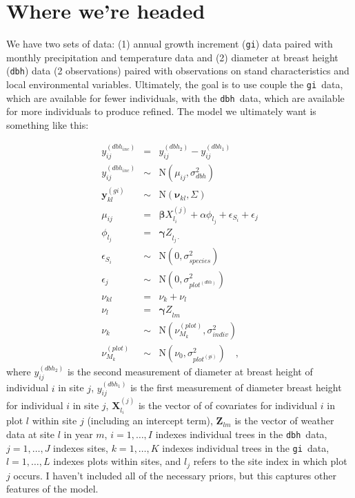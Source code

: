 \documentclass[12pt]{article}
\newcommand{\gi}{{\tt gi}}
\newcommand{\dbh}{{\tt dbh}}
\begin{document}
\section*{Where we're headed}

We have two sets of data: (1) annual growth increment (\gi) data paired
with monthly precipitation and temperature data and (2) diameter at
breast height (\dbh) data (2 observations) paired with observations on stand
characteristics and local environmental variables. Ultimately, the
goal is to use couple the \gi\ data, which are available for fewer
individuals, with the \dbh\ data, which are available for more
individuals to produce refined. The model we ultimately want is
something like this:

\begin{eqnarray*}
y^{(dbh_{inc})}_{ij} &=& y^{(dbh_2)}_{ij} - y^{(dbh_1)}_{ij} \\
y^{(dbh_{inc})}_{ij} &\sim& \mbox{N}(\mu_{ij}, \sigma^2_{dbh}) \\
{\bm y}^{(gi)}_{kl} &\sim& \mbox{N}({\bm\nu}_{kl}, \Sigma) \\
\mu_{ij} &=& {\bm\beta X}_{l_i}^{(j)} + \alpha\phi_{l_j} +
             \epsilon_{S_i} + \epsilon_{j} \\
\phi_{l_j} &=& {\bm\gamma Z}_{l_j\cdot} \\
\epsilon_{S_i} &\sim& \mbox{N}(0, \sigma^2_{species}) \\
\epsilon_{j} &\sim& \mbox{N}(0, \sigma^2_{plot^{(dbh)}}) \\
\nu_{kl} &=& \nu_k + \nu_l \\
\nu_l &=& {\bm\gamma Z}_{lm} \\
\nu_k &\sim& \mbox{N}(\nu^{(plot)}_{M_k}, \sigma^2_{indiv}) \\
\nu^{(plot)}_{M_k} &\sim& \mbox{N}(\nu_0, \sigma^2_{plot^{(gi)}})
\quad ,
\end{eqnarray*}
where $y_{ij}^{(dbh_2)}$ is the second measurement of diameter at
breast height of individual $i$ in site $j$, $y_{ij}^{(dbh_1)}$ is the
first measurement of diameter breast height for individual $i$ in site
$j$, ${\bm X}_{l_i}^{(j)}$ is the vector of of covariates for individual $i$
in plot $l$ within site $j$ (including an intercept term), ${\bm Z}_{lm}$ is the
vector of weather data at site $l$ in year $m$, $i=1,\dots,I$ indexes
individual trees in the \dbh\ data, $j=1,\dots,J$ indexes sites,
$k=1,\dots,K$ indexes individual trees in the \gi\ data, $l=1,\dots,L$
indexes plots within sites, and $l_j$ refers to the site index in
which plot $j$ occurs. I haven't included all of the necessary priors,
but this captures other features of the model.
\end{document}

